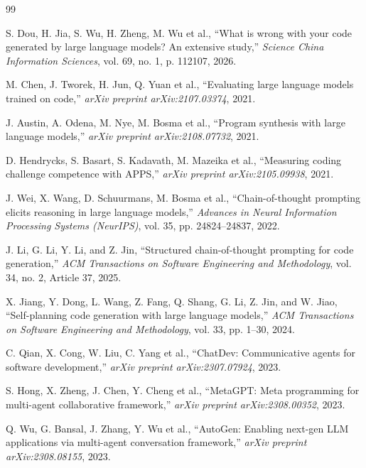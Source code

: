 \documentclass[11pt,a4paper]{article}
\begin{document}
\begin{thebibliography}{99}
\footnotesize

S. Dou, H. Jia, S. Wu, H. Zheng, M. Wu et al., ``What is wrong with your code generated by large language models? An extensive study,'' \textit{Science China Information Sciences}, vol. 69, no. 1, p. 112107, 2026.

M. Chen, J. Tworek, H. Jun, Q. Yuan et al., ``Evaluating large language models trained on code,'' \textit{arXiv preprint arXiv:2107.03374}, 2021.

J. Austin, A. Odena, M. Nye, M. Bosma et al., ``Program synthesis with large language models,'' \textit{arXiv preprint arXiv:2108.07732}, 2021.

D. Hendrycks, S. Basart, S. Kadavath, M. Mazeika et al., ``Measuring coding challenge competence with APPS,'' \textit{arXiv preprint arXiv:2105.09938}, 2021.

J. Wei, X. Wang, D. Schuurmans, M. Bosma et al., ``Chain-of-thought prompting elicits reasoning in large language models,'' \textit{Advances in Neural Information Processing Systems (NeurIPS)}, vol. 35, pp. 24824--24837, 2022.

J. Li, G. Li, Y. Li, and Z. Jin, ``Structured chain-of-thought prompting for code generation,'' \textit{ACM Transactions on Software Engineering and Methodology}, vol. 34, no. 2, Article 37, 2025.

X. Jiang, Y. Dong, L. Wang, Z. Fang, Q. Shang, G. Li, Z. Jin, and W. Jiao, ``Self-planning code generation with large language models,'' \textit{ACM Transactions on Software Engineering and Methodology}, vol. 33, pp. 1--30, 2024.

C. Qian, X. Cong, W. Liu, C. Yang et al., ``ChatDev: Communicative agents for software development,'' \textit{arXiv preprint arXiv:2307.07924}, 2023.

S. Hong, X. Zheng, J. Chen, Y. Cheng et al., ``MetaGPT: Meta programming for multi-agent collaborative framework,'' \textit{arXiv preprint arXiv:2308.00352}, 2023.

Q. Wu, G. Bansal, J. Zhang, Y. Wu et al., ``AutoGen: Enabling next-gen LLM applications via multi-agent conversation framework,'' \textit{arXiv preprint arXiv:2308.08155}, 2023.


\end{thebibliography}
\end{document}
